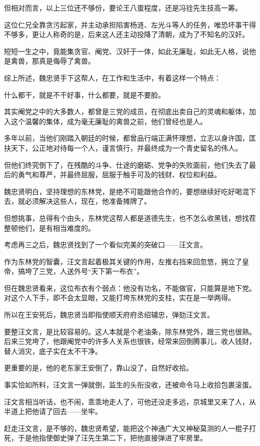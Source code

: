 \begin{multicols}{\theparacolNo}
		但相对而言，以上三位还不够份，要论王八蛋程度，还是冯铨先生技高一筹。

		这位仁兄全靠贪污起家，并主动承担陷害杨涟、左光斗等人的任务，唯恐坏事干得不够多，更让人称奇的是，后来这人还主动投降了清朝，成为了不知名的汉奸。

		短短一生之中，竟能集贪官、阉党、汉奸于一体，如此无廉耻，如此无人格，说他是禽兽，那真是侮辱了禽兽。

		综上所述，魏忠贤手下这帮人，在工作和生活中，有着这样一个特点：

		什么都干，就是不干好事，什么都要，就是不要脸。

		其实阉党之中的大多数人，都曾是三党的成员，在彻底出卖自己的灵魂和躯体，加入这个温馨的集体，成为毫无廉耻的禽兽之前，他们曾经也是人。

		多年以前，当他们刚踏入朝廷的时候，都曾品行端正满怀理想，立志以身许国，匡扶天下，公正地对待每一个人，谨言慎行，并最终成为一个青史留名的伟人。

		但他们终究倒下了，在残酷的斗争、仕途的磨砺、党争的失败面前，他们失去了最后的勇气和尊严，并最终屈服，屈服于触手可及的钱财、权位和利益。

		魏忠贤明白，坚持理想的东林党，是绝不可能跟他合作的，要想继续好吃好喝混下去，就必须解决这些人，现在，他准备摊牌了。

		但想挑事，总得有个由头，东林党这帮人都是道德先生，也不怎么收黑钱，想找茬整顿他们，是有相当难度的。

		考虑再三之后，魏忠贤找到了一个看似完美的突破口——汪文言。

		作为东林党的智囊，汪文言起着极其关键的作用，左推右挡来回忽悠，拥立了皇帝，搞垮了三党，人送外号“天下第一布衣”。

		但在魏忠贤看来，这位布衣有个弱点：他没有功名，不能做官，只能算是地下党。对这个人下手，即不会太显眼，又能打垮东林党的支柱，实在是一举两得。

		所以在王安死后，魏忠贤当即指使顺天府府丞绍辅忠，弹劾汪文言。

		要整汪文言，是比较容易的。这人本就是个老油条，除东林党外，跟三党也很熟。后来三党垮了，他跟阉党中的许多人关系也很铁，经常来回倒腾事儿，收人钱财，替人消灾，底子实在太不干净。

		更重要的是，他的老东家王安倒了，靠山没了，自然好收拾。

		事实恰如所料，汪文言一弹就倒，监生的头衔没收，还被命令马上收拾包裹滚蛋。

		汪文言相当听话，也不闹，乖乖地走人了，可他还没走多远，京城里又来了人，从半道上把他请了回去——坐牢。

		赶走汪文言，是不够的，魏忠贤希望，能把这个神通广大又神秘莫测的人一棍子打死，于是他指使御史弹了汪先生第二下，把他直接弹进了牢房里。


\end{multicols}
